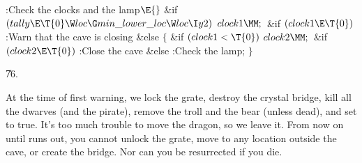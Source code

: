 \Y\B\4:Check the clocks and the lamp\X${}\E{}$\6
\&{if} ${}(\\{tally}\E\T{0}\W\\{loc}\G\\{min\_lower\_loc}\W\\{loc}\I\\{y2}){}$%
\1\5
${}\\{clock1}\MM;{}$\2\6
\&{if} ${}(\\{clock1}\E\T{0}){}$\1\5
:Warn that the cave is closing\X\2\6
\&{else}\5
${}\{{}$\1\6
\&{if} ${}(\\{clock1}<\T{0}){}$\1\5
${}\\{clock2}\MM;{}$\2\6
\&{if} ${}(\\{clock2}\E\T{0}){}$\1\5
:Close the cave\X\2\6
\&{else}\1\5
:Check the lamp\X;\2\6
\4${}\}{}$\2\par
\U76.\fi

At the time of first warning, we lock the grate, destroy the crystal
bridge,
kill all the dwarves (and the pirate), remove the troll and the bear
(unless dead), and set  to true. It's too much trouble to move
the dragon, so we leave it. From now on until  runs out, you
cannot unlock the grate, move to any location outside the cave, or
create the bridge. Nor can you be resurrected if you die.

